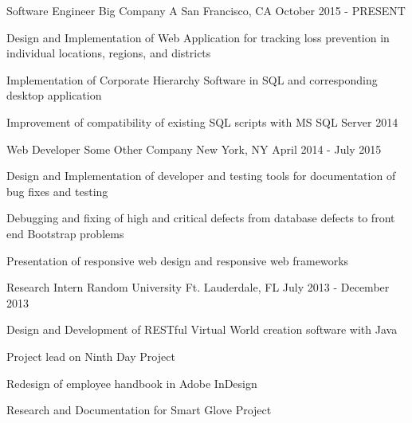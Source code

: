 \begin{cventries}
  \cventry
    {Software Engineer}
    {Big Company A}
    {San Francisco, CA}
    {October 2015 - PRESENT}
    {
      \begin{cvitems}
        \item {Design and Implementation of Web Application for tracking loss prevention in individual locations, regions, and districts}
        \item{Implementation of Corporate Hierarchy Software in SQL and corresponding desktop application}
        \item {Improvement of compatibility of existing SQL scripts with MS SQL Server 2014}
      \end{cvitems}
    }
  \cventry
    {Web Developer}
    {Some Other Company}
    {New York, NY}
    {April 2014 - July 2015}
    {
      \begin{cvitems}
        \item {Design and Implementation of developer and testing tools for documentation of bug fixes and testing}
        \item {Debugging and fixing of high and critical defects from database defects to front end Bootstrap problems}
        \item {Presentation of responsive web design and responsive web frameworks}
      \end{cvitems}
    }
  \cventry
    {Research Intern}
    {Random University}
    {Ft. Lauderdale, FL}
    {July 2013 - December 2013}
    {
      \begin{cvitems}
        \item {Design and Development of RESTful Virtual World creation software with Java}
        \item {Project lead on Ninth Day Project}
        \item {Redesign of employee handbook in Adobe InDesign}
        \item{Research and Documentation for Smart Glove Project}
      \end{cvitems} 
    }
\end{cventries}
